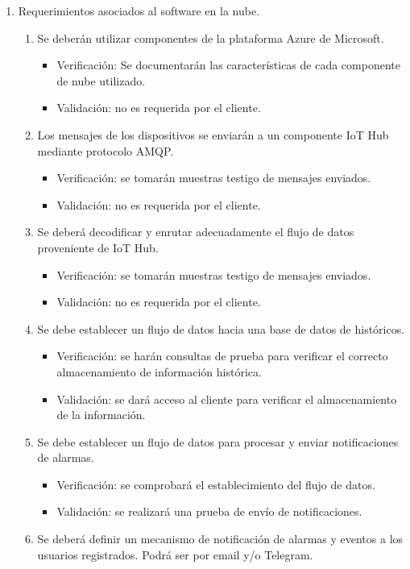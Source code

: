\documentclass[
11pt, %
]{charter}
\begin{document}
\begin{enumerate}
	\item Requerimientos asociados al software en la nube.
		\begin{enumerate}
			\item Se deberán utilizar componentes de la plataforma Azure de Microsoft.
			\begin{itemize}
				\item Verificación: Se documentarán las características de cada componente de nube utilizado.
				\item Validación: no es requerida por el cliente.
			\end{itemize}
			\item Los mensajes de los dispositivos se enviarán a un componente IoT Hub mediante protocolo AMQP.
			\begin{itemize}
				\item Verificación: se tomarán muestras testigo de mensajes enviados.
				\item Validación: no es requerida por el cliente.
			\end{itemize}
			\item Se deberá decodificar y enrutar adecuadamente el flujo de datos proveniente de IoT Hub.
			\begin{itemize}
				\item Verificación: se tomarán muestras testigo de mensajes enviados.
				\item Validación: no es requerida por el cliente.
			\end{itemize}
			\item Se debe establecer un flujo de datos hacia una base de datos de históricos.
			\begin{itemize}
				\item Verificación: se harán consultas de prueba para verificar el correcto almacenamiento de información histórica.
				\item Validación: se dará acceso al cliente para verificar el almacenamiento de la información.
			\end{itemize}
			\item Se debe establecer un flujo de datos para procesar y enviar notificaciones de alarmas.
			\begin{itemize}
				\item Verificación: se comprobará el establecimiento del flujo de datos.
				\item Validación: se realizará una prueba de envío de notificaciones.
			\end{itemize}
			\item Se deberá definir un mecanismo de notificación de alarmas y eventos a los usuarios registrados. Podrá ser por email y/o Telegram.

\end{enumerate}
\end{enumerate}
\end{document}
